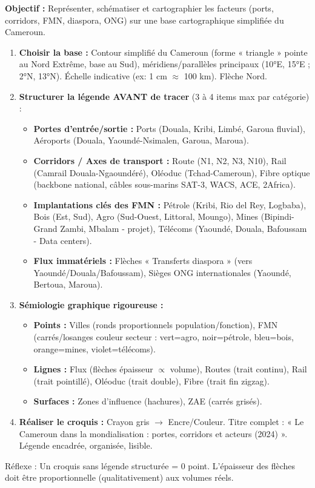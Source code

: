 \documentclass[11pt]{article}
\newcommand{\cle}[1]{{\popxbold\color{popdark}#1}}
\begin{document}
\begin{methode}
\textbf{Objectif :} Représenter, schématiser et cartographier les facteurs (ports, corridors, FMN, diaspora, ONG) sur une base cartographique simplifiée du Cameroun.
\begin{enumerate}
    \item \textbf{Choisir la base :} Contour simplifié du Cameroun (forme « triangle » pointe au Nord Extrême, base au Sud), méridiens/parallèles principaux (10°E, 15°E ; 2°N, 13°N). Échelle indicative (ex: 1 cm $\approx$ 100 km). Flèche Nord.
    \item \textbf{Structurer la légende AVANT de tracer} (3 à 4 items max par catégorie) :
    \begin{itemize}
        \item \textbf{Portes d'entrée/sortie :} Ports (Douala, Kribi, Limbé, Garoua fluvial), Aéroports (Douala, Yaoundé-Nsimalen, Garoua, Maroua).
        \item \textbf{Corridors / Axes de transport :} Route (N1, N2, N3, N10), Rail (Camrail Douala-Ngaoundéré), Oléoduc (Tchad-Cameroun), Fibre optique (backbone national, câbles sous-marins SAT-3, WACS, ACE, 2Africa).
        \item \textbf{Implantations clés des FMN :} Pétrole (Kribi, Rio del Rey, Logbaba), Bois (Est, Sud), Agro (Sud-Ouest, Littoral, Moungo), Mines (Bipindi-Grand Zambi, Mbalam - projet), Télécoms (Yaoundé, Douala, Bafoussam - Data centers).
        \item \textbf{Flux immatériels :} Flèches « Transferts diaspora » (vers Yaoundé/Douala/Bafoussam), Sièges ONG internationales (Yaoundé, Bertoua, Maroua).
    \end{itemize}
    \item \textbf{Sémiologie graphique rigoureuse :}
    \begin{itemize}
        \item \textbf{Points :} Villes (ronds proportionnels population/fonction), FMN (carrés/losanges couleur secteur : vert=agro, noir=pétrole, bleu=bois, orange=mines, violet=télécoms).
        \item \textbf{Lignes :} Flux (flèches épaisseur $\propto$ volume), Routes (trait continu), Rail (trait pointillé), Oléoduc (trait double), Fibre (trait fin zigzag).
        \item \textbf{Surfaces :} Zones d'influence (hachures), ZAE (carrés grisés).
    \end{itemize}
    \item \textbf{Réaliser le croquis :} Crayon gris $\rightarrow$ Encre/Couleur. Titre complet : « Le Cameroun dans la mondialisation : portes, corridors et acteurs (2024) ». Légende encadrée, organisée, lisible.
\end{enumerate}
\cle{Réflexe} : Un croquis sans légende structurée = 0 point. L'épaisseur des flèches doit être proportionnelle (qualitativement) aux volumes réels.
\end{methode}
\end{document}
